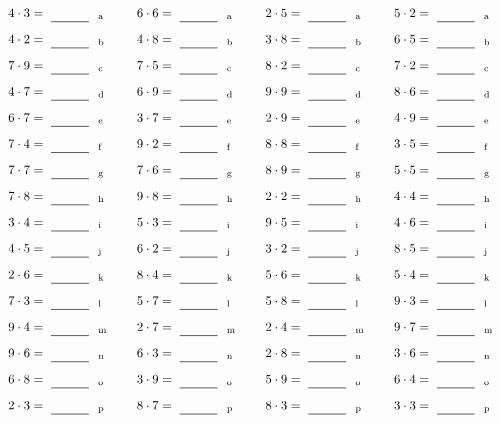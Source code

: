\documentclass
[
  draft    = true,
  fontsize = 11pt,
  parskip  = half-
]
{scrartcl}
\begin{document}
\par\vfill\par
\begin{align*}
    \pline{4\cdot3}&=\rline{a}
  & \pline{6\cdot6}&=\rline{a}
  & \pline{2\cdot5}&=\rline{a}
  & \pline{5\cdot2}&=\rline{a} \\[1ex]
    \pline{4\cdot2}&=\rline{b}
  & \pline{4\cdot8}&=\rline{b}
  & \pline{3\cdot8}&=\rline{b}
  & \pline{6\cdot5}&=\rline{b} \\[1ex]
    \pline{7\cdot9}&=\rline{c}
  & \pline{7\cdot5}&=\rline{c}
  & \pline{8\cdot2}&=\rline{c}
  & \pline{7\cdot2}&=\rline{c} \\[1ex]
    \pline{4\cdot7}&=\rline{d}
  & \pline{6\cdot9}&=\rline{d}
  & \pline{9\cdot9}&=\rline{d}
  & \pline{8\cdot6}&=\rline{d} \\[1ex]
    \pline{6\cdot7}&=\rline{e}
  & \pline{3\cdot7}&=\rline{e}
  & \pline{2\cdot9}&=\rline{e}
  & \pline{4\cdot9}&=\rline{e} \\[1ex]
    \pline{7\cdot4}&=\rline{f}
  & \pline{9\cdot2}&=\rline{f}
  & \pline{8\cdot8}&=\rline{f}
  & \pline{3\cdot5}&=\rline{f} \\[1ex]
    \pline{7\cdot7}&=\rline{g}
  & \pline{7\cdot6}&=\rline{g}
  & \pline{8\cdot9}&=\rline{g}
  & \pline{5\cdot5}&=\rline{g} \\[1ex]
    \pline{7\cdot8}&=\rline{h}
  & \pline{9\cdot8}&=\rline{h}
  & \pline{2\cdot2}&=\rline{h}
  & \pline{4\cdot4}&=\rline{h} \\[1ex]
    \pline{3\cdot4}&=\rline{i}
  & \pline{5\cdot3}&=\rline{i}
  & \pline{9\cdot5}&=\rline{i}
  & \pline{4\cdot6}&=\rline{i} \\[1ex]
    \pline{4\cdot5}&=\rline{j}
  & \pline{6\cdot2}&=\rline{j}
  & \pline{3\cdot2}&=\rline{j}
  & \pline{8\cdot5}&=\rline{j} \\[1ex]
    \pline{2\cdot6}&=\rline{k}
  & \pline{8\cdot4}&=\rline{k}
  & \pline{5\cdot6}&=\rline{k}
  & \pline{5\cdot4}&=\rline{k} \\[1ex]
    \pline{7\cdot3}&=\rline{l}
  & \pline{5\cdot7}&=\rline{l}
  & \pline{5\cdot8}&=\rline{l}
  & \pline{9\cdot3}&=\rline{l} \\[1ex]
    \pline{9\cdot4}&=\rline{m}
  & \pline{2\cdot7}&=\rline{m}
  & \pline{2\cdot4}&=\rline{m}
  & \pline{9\cdot7}&=\rline{m} \\[1ex]
    \pline{9\cdot6}&=\rline{n}
  & \pline{6\cdot3}&=\rline{n}
  & \pline{2\cdot8}&=\rline{n}
  & \pline{3\cdot6}&=\rline{n} \\[1ex]
    \pline{6\cdot8}&=\rline{o}
  & \pline{3\cdot9}&=\rline{o}
  & \pline{5\cdot9}&=\rline{o}
  & \pline{6\cdot4}&=\rline{o} \\[1ex]
    \pline{2\cdot3}&=\rline{p}
  & \pline{8\cdot7}&=\rline{p}
  & \pline{8\cdot3}&=\rline{p}
  & \pline{3\cdot3}&=\rline{p}
\end{align*}
\end{document}

